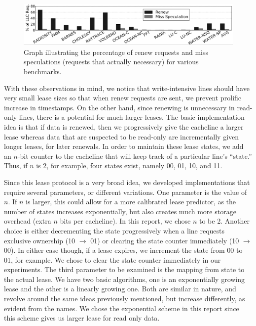 \documentclass[12pt]{article}
\begin{document}
\begin{figure}
\begin{center}
  \includegraphics[width=16cm]{image1.png}
  \caption{Graph illustrating the percentage of renew requests and miss speculations (requests that actually necessary) for various benchmarks. }
  \label{fig:renewals}
\end{center}
\end{figure}

With these observations in mind, we notice that write-intensive lines 
should have very small lease sizes so that when renew requests are 
sent, we prevent prolific increase in timestamps. On the other hand, 
since renewing is unnecessary in read-only lines, there is a potential 
for much larger leases. The basic implementation idea is that if data
is renewed, then we progressively give the cacheline a larger lease 
whereas data that are suspected to be read-only are incrementally 
given longer leases, for later renewals. In order to maintain these 
lease states, we add an $n$-bit counter to the cacheline that will 
keep track of a particular line’s “state.” Thus, if $n$ is 2, for 
example, four states exist, namely 00, 01, 10, and 11. 

Since this lease protocol is a very broad idea, we developed 
implementations that require several parameters, or different 
variations. One parameter is the value of $n$. If $n$ is larger, this 
could allow for a more calibrated lease predictor, as the number of 
states increases exponentially, but also creates much more storage 
overhead (extra $n$ bits per cacheline). In this report, we chose $n$ 
to be 2. Another choice is either decrementing the state progressively 
when a line requests exclusive ownership (10 $\rightarrow$ 01) or 
clearing the state counter immediately (10 $\rightarrow$ 00). In 
either case though, if a lease expires, we increment the state from 00 
to 01, for example. We chose to clear the state counter immediately in 
our experiments. The third parameter to be examined is the mapping 
from state to the actual lease. We have two basic algorithms, one is 
an exponentially growing lease and the other is a linearly growing 
one.  Both are similar in nature, and revolve around the same ideas 
previously mentioned, but increase differently, as evident from the 
names. We chose the exponential scheme in this report since this 
scheme gives us larger lease for read only data.
\end{document}
